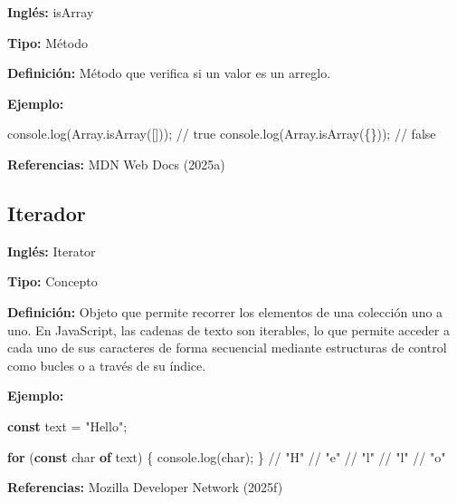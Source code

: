 \documentclass[
  letterpaper,
  DIV=11,
  numbers=noendperiod]{scrreprt}
\newenvironment{Shaded}{\begin{snugshade}}{\end{snugshade}}
\newcommand{\BuiltInTok}[1]{\textcolor[rgb]{0.00,0.23,0.31}{#1}}
\newcommand{\CommentTok}[1]{\textcolor[rgb]{0.37,0.37,0.37}{#1}}
\newcommand{\ControlFlowTok}[1]{\textcolor[rgb]{0.00,0.23,0.31}{\textbf{#1}}}
\newcommand{\FunctionTok}[1]{\textcolor[rgb]{0.28,0.35,0.67}{#1}}
\newcommand{\KeywordTok}[1]{\textcolor[rgb]{0.00,0.23,0.31}{\textbf{#1}}}
\newcommand{\NormalTok}[1]{\textcolor[rgb]{0.00,0.23,0.31}{#1}}
\newcommand{\OperatorTok}[1]{\textcolor[rgb]{0.37,0.37,0.37}{#1}}
\newcommand{\StringTok}[1]{\textcolor[rgb]{0.13,0.47,0.30}{#1}}
\let\oldsubsection\subsection
\renewcommand{\subsection}{\phantomsection\oldsubsection}
\begin{document}
\textbf{Inglés:} isArray

\textbf{Tipo:} Método

\textbf{Definición:} Método que verifica si un valor es un arreglo.

\textbf{Ejemplo:}

\begin{Shaded}
\begin{Highlighting}[]
\BuiltInTok{console}\OperatorTok{.}\FunctionTok{log}\NormalTok{(}\BuiltInTok{Array}\OperatorTok{.}\FunctionTok{isArray}\NormalTok{([]))}\OperatorTok{;} \CommentTok{// true}
\BuiltInTok{console}\OperatorTok{.}\FunctionTok{log}\NormalTok{(}\BuiltInTok{Array}\OperatorTok{.}\FunctionTok{isArray}\NormalTok{(\{\}))}\OperatorTok{;} \CommentTok{// false}
\end{Highlighting}
\end{Shaded}

\textbf{Referencias:} MDN Web Docs (2025a)

\subsection*{Iterador}\label{glos-iterador}

\textbf{Inglés:} Iterator

\textbf{Tipo:} Concepto

\textbf{Definición:} Objeto que permite recorrer los elementos de una
colección uno a uno. En JavaScript, las cadenas de texto son iterables,
lo que permite acceder a cada uno de sus caracteres de forma secuencial
mediante estructuras de control como bucles o a través de su índice.

\textbf{Ejemplo:}

\begin{Shaded}
\begin{Highlighting}[]
\KeywordTok{const}\NormalTok{ text }\OperatorTok{=} \StringTok{"Hello"}\OperatorTok{;}

\ControlFlowTok{for}\NormalTok{ (}\KeywordTok{const}\NormalTok{ char }\KeywordTok{of}\NormalTok{ text) \{}
  \BuiltInTok{console}\OperatorTok{.}\FunctionTok{log}\NormalTok{(char)}\OperatorTok{;}
\NormalTok{\}}
\CommentTok{// "H"}
\CommentTok{// "e"}
\CommentTok{// "l"}
\CommentTok{// "l"}
\CommentTok{// "o"}
\end{Highlighting}
\end{Shaded}

\textbf{Referencias:} Mozilla Developer Network (2025f)
\end{document}
